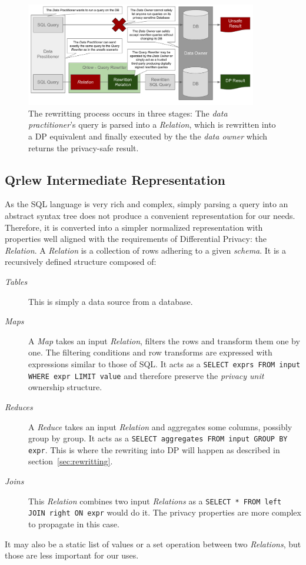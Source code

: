 \documentclass[letterpaper]{article} %
\begin{document}
\begin{figure}[t]
    \centering
    \includegraphics[width=0.9\textwidth]{figures/qrlew_process} %
    \caption{The rewritting process occurs in three stages: The \emph{data practitioner}'s query is parsed into a \emph{Relation}, which is rewritten into a DP equivalent and finally executed by the the \emph{data owner} which returns the privacy-safe result.}
    \label{fig:process}
\end{figure}

\subsection{Qrlew Intermediate Representation}
\label{sec:intermediate_representation}

As the SQL language is very rich and complex, simply parsing a query into an abstract syntax tree does not produce a convenient representation for our needs. Therefore, it is converted into a simpler normalized representation with properties well aligned with the requirements of Differential Privacy: the \emph{Relation}. A \emph{Relation} is a collection of rows adhering to a given \emph{schema}. It is a recursively defined structure composed of:
\begin{description}
    \item[\emph{Tables}] This is simply a data source from a database.
    \item[\emph{Maps}] A \emph{Map} takes an input \emph{Relation}, filters the rows and transform them one by one. The filtering conditions and row transforms are expressed with expressions similar to those of SQL. It acts as a \texttt{SELECT exprs FROM input WHERE expr LIMIT value} and therefore preserve the \emph{privacy unit} ownership structure.
    \item[\emph{Reduces}] A \emph{Reduce} takes an input \emph{Relation} and aggregates some columns, possibly group by group. It acts as a \texttt{SELECT aggregates FROM input GROUP BY expr}. This is where the rewriting into DP will happen as described in section~\ref{sec:rewritting}.
    \item[\emph{Joins}] This \emph{Relation} combines two input \emph{Relations} as a \texttt{SELECT * FROM left JOIN right ON expr} would do it. The privacy properties are more complex to propagate in this case.
\end{description}
It may also be a static list of values or a set operation between two \emph{Relations}, but those are less important for our uses.
\end{document}
